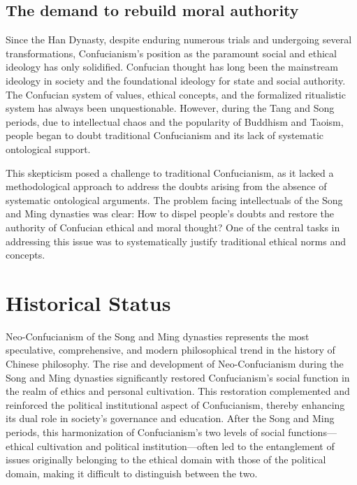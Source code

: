 \documentclass[
]{book}
\begin{document}
\hypertarget{the-demand-to-rebuild-moral-authority}{%
\subsection{The demand to rebuild moral authority}\label{the-demand-to-rebuild-moral-authority}}

Since the Han Dynasty, despite enduring numerous trials and undergoing several transformations, Confucianism's position as the paramount social and ethical ideology has only solidified. Confucian thought has long been the mainstream ideology in society and the foundational ideology for state and social authority. The Confucian system of values, ethical concepts, and the formalized ritualistic system has always been unquestionable. However, during the Tang and Song periods, due to intellectual chaos and the popularity of Buddhism and Taoism, people began to doubt traditional Confucianism and its lack of systematic ontological support.

This skepticism posed a challenge to traditional Confucianism, as it lacked a methodological approach to address the doubts arising from the absence of systematic ontological arguments. The problem facing intellectuals of the Song and Ming dynasties was clear: How to dispel people's doubts and restore the authority of Confucian ethical and moral thought? One of the central tasks in addressing this issue was to systematically justify traditional ethical norms and concepts.

\hypertarget{historical-status-2}{%
\section{Historical Status}\label{historical-status-2}}

Neo-Confucianism of the Song and Ming dynasties represents the most speculative, comprehensive, and modern philosophical trend in the history of Chinese philosophy. The rise and development of Neo-Confucianism during the Song and Ming dynasties significantly restored Confucianism's social function in the realm of ethics and personal cultivation. This restoration complemented and reinforced the political institutional aspect of Confucianism, thereby enhancing its dual role in society's governance and education. After the Song and Ming periods, this harmonization of Confucianism's two levels of social functions---ethical cultivation and political institution---often led to the entanglement of issues originally belonging to the ethical domain with those of the political domain, making it difficult to distinguish between the two.
\end{document}
